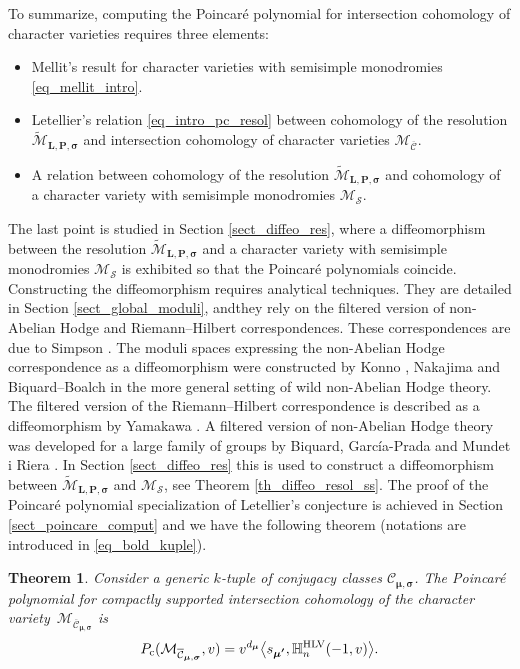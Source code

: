 \documentclass[JEP,XML,SOM,NoEqCountersInSection,Unicode,published]{cedram}
\newcommand{\rc}{\mathrm{c}}
\newcommand{\HLV}{\textup{HLV}}
\newcommand{\blangle}{\bigl\langle}
\newcommand{\brangle}{\bigr\rangle}
\theoremstyle{definition}
\theoremstyle{plain}
\newtheorem{theorem}[definition]{Theorem}
\newcommand{\mlps}{\widetilde{\mathcal{M}}_{\boldsymbol{L},\boldsymbol{P},\boldsymbol{\sigma}}}
\newcommand{\mcbar}{\mathcal{M}_{\boldsymbol{\overline{\mathcal{C}}}}}
\begin{document}
To summarize, computing the Poincaré polynomial for intersection cohomology of character varieties requires three elements:
\begin{itemize}
\item Mellit's result for character varieties with semisimple monodromies \eqref{eq_mellit_intro}.
\item Letellier's relation \eqref{eq_intro_pc_resol} between cohomology of the resolution $\mlps$ and intersection cohomology of character varieties $\mcbar$.
\item A relation between cohomology of the resolution $\mlps$ and cohomology of a character variety with semisimple monodromies $\mathcal{M}_{\boldsymbol{\mathcal{S}}}$.
\end{itemize}
The last point is studied in Section \ref{sect_diffeo_res}, where a diffeomorphism between the resolution $\mlps$ and a character variety with semisimple monodromies $\mathcal{M}_{\boldsymbol{\mathcal{S}}}$ is exhibited so that the Poincaré polynomials coincide. Constructing the diffeomorphism requires analytical techniques. They are detailed in Section \ref{sect_global_moduli}, andthey rely on the filtered version of non-Abelian Hodge and Riemann--Hilbert correspondences.
These correspondences are due to Simpson \cite{Simpson}. The moduli spaces expressing the non-Abelian Hodge correspondence as a diffeomorphism were constructed by Konno \cite{Konno}, Nakajima \cite{Nakajima_1996} and Biquard--Boalch \cite{Biquard_Boalch_2004} in the more general setting of wild non-Abelian Hodge theory. The filtered version of the Riemann--Hilbert correspondence is described as a diffeomorphism by Yamakawa \cite{Yamakawa}. A filtered version of non-Abelian Hodge theory was developed for a large family of groups by Biquard, García-Prada and Mundet i Riera \cite{Biquard_Garcia_Prada_Riera}. In Section \ref{sect_diffeo_res} this is used to construct a diffeomorphism between $\mlps$ and $\mathcal{M}_{\boldsymbol{\mathcal{S}}}$, see Theorem \ref{th_diffeo_resol_ss}. The proof of the Poincaré polynomial specialization of Letellier's conjecture is achieved in Section \ref{sect_poincare_comput} and we have the following theorem (notations are introduced in \eqref{eq_bold_kuple}).

\begin{theorem}\label{th_poincaré_intro}
Consider a generic $k$-tuple of conjugacy classes ${\mathcal{C}}_{\boldsymbol{\mu},\boldsymbol{\sigma}}$. The Poincaré polynomial for compactly supported intersection cohomology of the character variety~$\mathcal{M}_{\overline{{\mathcal{C}}}_{\boldsymbol{\mu},\boldsymbol{\sigma}}}$ is
\[
P_{\rc}(\mathcal{M}_{\overline{{\mathcal{C}}}_{\boldsymbol{\mu},\boldsymbol{\sigma}}},v) = v^{d_{\boldsymbol{\mu}}}\blangle s_{\boldsymbol{\mu'}}, \mathbb{H}_n^{\HLV}(-1,v)\brangle.
\]
\end{theorem}
\end{document}
